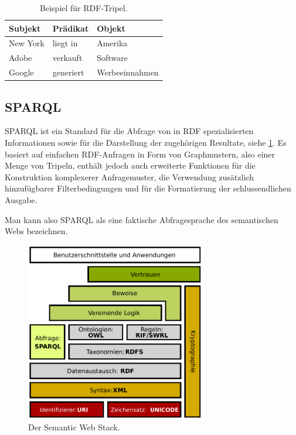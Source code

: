 \documentclass[headsepline,titlepage,ngerman,twoside,12pt]{report}
\begin{document}
\begin{table}
\begin{centering}
\begin{tabularx}{\textwidth}{XXX}
\toprule
\textrm{Subjekt}			&\textrm{Prädikat}			&\textrm{Objekt}\\
\midrule
New York				&liegt in				&Amerika\\
Adobe				    &verkauft				&Software\\
Google					&generiert				&Werbeeinnahmen\\
\bottomrule
\end{tabularx}
\end{centering}
\caption{Beispiel für RDF-Tripel.}
\label{tab:rdfexample}
\end{table}


\subsection{\acs{SPARQL}}
\label{sub:sparql}
\ac{SPARQL} ist ein Standard für die Abfrage von in \ac{RDF} spezialisierten Informationen sowie für die Darstellung der zugehörigen Resultate, siehe \cref{img:semanticwebstack1}.
Es basiert auf einfachen \ac{RDF}-Anfragen in Form von Graphmustern, also einer Menge von Tripeln, enthält jedoch auch erweiterte Funktionen für die Konstruktion komplexerer Anfragemuster, die Verwendung zusätzlich hinzufügbarer Filterbedingungen und für die Formatierung der schlussendlichen Ausgabe.


Man kann also \ac{SPARQL} als eine faktische Abfragesprache des semantischen Webs bezeichnen.
\begin{figure}
\centering
\includegraphics[width=0.7\textwidth]{images/swebstackde.pdf}
\caption{Der Semantic Web Stack.}
\label{img:semanticwebstack1}
\end{figure}
\end{document}
